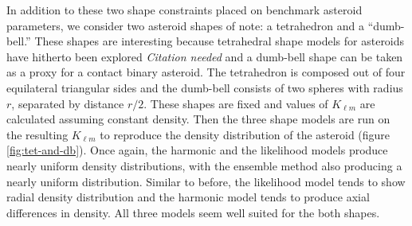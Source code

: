 \documentclass{aastex631}
\newcommand{\jtd}[1]{{\color{red}\textit{#1}}}
\begin{document}
In addition to these two shape constraints placed on benchmark asteroid parameters, we consider two asteroid shapes of note: a tetrahedron and a ``dumb-bell.'' These shapes are interesting because tetrahedral shape models for asteroids have hitherto been explored \jtd{Citation needed} and a dumb-bell shape can be taken as a proxy for a contact binary asteroid. The tetrahedron is composed out of four equilateral triangular sides and the dumb-bell consists of two spheres with radius $r$, separated by distance $r/2$. These shapes are fixed and values of $K_{\ell m}$ are calculated assuming constant density. Then the three shape models are run on the resulting $K_{\ell m}$ to reproduce the density distribution of the asteroid (figure \ref{fig:tet-and-db}). Once again, the harmonic and the likelihood models produce nearly uniform density distributions, with the ensemble method also producing a nearly uniform distribution. Similar to before, the likelihood model tends to show radial density distribution and the harmonic model tends to produce axial differences in density. All three models seem well suited for the both shapes.
\end{document}
